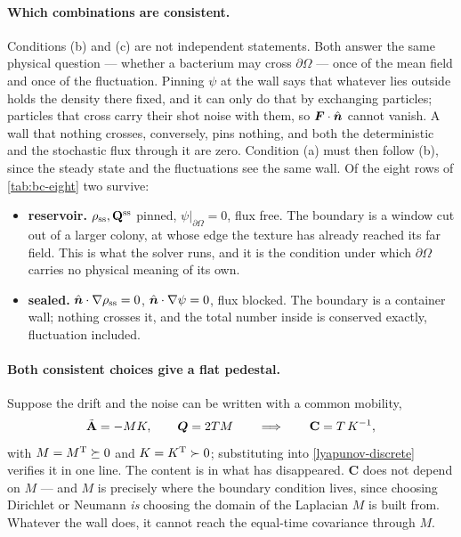\documentclass[a5paper]{article}
\begin{document}
\paragraph{Which combinations are consistent.} Conditions (b) and (c) are not independent statements. Both answer the same physical question --- whether a bacterium may cross $\partial\Omega$ --- once of the mean field and once of the fluctuation. Pinning $\psi$ at the wall says that whatever lies outside holds the density there fixed, and it can only do that by exchanging particles; particles that cross carry their shot noise with them, so $\boldsymbol F\cdot\hat{\boldsymbol{n}}$ cannot vanish. A wall that nothing crosses, conversely, pins nothing, and both the deterministic and the stochastic flux through it are zero. Condition (a) must then follow (b), since the steady state and the fluctuations see the same wall. Of the eight rows of \cref{tab:bc-eight} two survive:
\begin{itemize}
    \item \textbf{reservoir.} $\rho_{\mathrm{ss}},\mathbf{Q}^{\mathrm{ss}}$ pinned, $\psi|_{\partial\Omega}=0$, flux free. The boundary is a window cut out of a larger colony, at whose edge the texture has already reached its far field. This is what the solver runs, and it is the condition under which $\partial\Omega$ carries no physical meaning of its own.
    \item \textbf{sealed.} $\hat{\boldsymbol{n}}\cdot\nabla\rho_{\mathrm{ss}}=0$, $\hat{\boldsymbol{n}}\cdot\nabla\psi=0$, flux blocked. The boundary is a container wall; nothing crosses it, and the total number inside is conserved exactly, fluctuation included.
\end{itemize}

\paragraph{Both consistent choices give a flat pedestal.} Suppose the drift and the noise can be written with a common mobility,
\begin{equation}
    \label{eq:fdt-split}
    \tilde{\mathbf{A}} = -MK,\qquad \boldsymbol Q = 2TM
    \qquad\Longrightarrow\qquad
    \mathbf{C} = T\,K^{-1},
\end{equation}
with $M=M^{\mathrm{T}}\succeq0$ and $K=K^{\mathrm{T}}\succ0$; substituting into \eqref{lyapunov-discrete} verifies it in one line. The content is in what has disappeared. $\mathbf{C}$ does not depend on $M$ --- and $M$ is precisely where the boundary condition lives, since choosing Dirichlet or Neumann \emph{is} choosing the domain of the Laplacian $M$ is built from. Whatever the wall does, it cannot reach the equal-time covariance through $M$.
\end{document}
